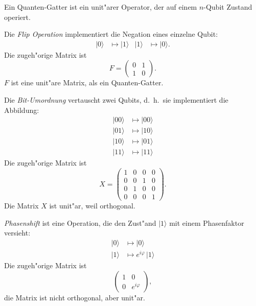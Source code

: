 \begin{definition}
Ein Quanten-Gatter ist ein unit"arer Operator, der auf einem 
$n$-Qubit Zustand operiert.
\end{definition}

\begin{beispiel}
Die {\em Flip Operation} implementiert die Negation eines einzelne Qubit:
\begin{align*}
|0\rangle&\mapsto |1\rangle & |1\rangle&\mapsto |0\rangle.
\end{align*}
Die zugeh"orige Matrix ist
\[
F=\begin{pmatrix}
0&1\\
1&0
\end{pmatrix}.
\]
$F$ ist eine unit"are Matrix, als ein Quanten-Gatter.
\end{beispiel}

\begin{beispiel}
Die {\em Bit-Umordnung} vertauscht zwei Qubits, d.~h.~sie implementiert
die Abbildung:
\begin{align*}
|00\rangle&\mapsto |00\rangle\\
|01\rangle&\mapsto |10\rangle\\
|10\rangle&\mapsto |01\rangle\\
|11\rangle&\mapsto |11\rangle
\end{align*}
Die zugeh"orige Matrix ist
\[
X=
\begin{pmatrix}
1&0&0&0\\
0&0&1&0\\
0&1&0&0\\
0&0&0&1
\end{pmatrix}.
\]
Die Matrix $X$ ist unit"ar, weil orthogonal.
\end{beispiel}

\begin{beispiel}
{\em Phasenshift} ist eine Operation, die den Zust"and $|1\rangle$ 
mit einem Phasenfaktor versieht:
\begin{align*}
|0\rangle &\mapsto |0\rangle\\
|1\rangle &\mapsto e^{i\varphi}\,|1\rangle
\end{align*}
Die zugeh"orige Matrix ist
\[
\begin{pmatrix}
1&0\\
0&e^{i\varphi}
\end{pmatrix},
\]
die Matrix ist nicht orthogonal, aber unit"ar.
\end{beispiel}

